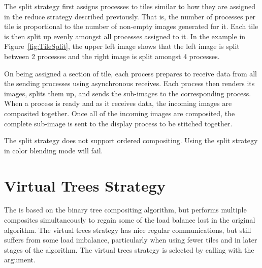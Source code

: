 The split strategy first assigns processes to tiles similar to how they are
assigned in the reduce strategy described previously.  That is, the number
of processes per tile is proportional to the number of non-empty images
generated for it.  Each tile is then split up evenly amongst all processes
assigned to it.  In the example in Figure~\ref{fig:TileSplit}, the upper
left image shows that the left image is split between 2 processes and the
right image is split amongst 4 processes.

On being assigned a section of tile, each process prepares to receive data
from all the sending processes using asynchronous receives.  Each process
then renders its images, splits them up, and sends the sub-images to the
corresponding process.  When a process is ready and as it receives data,
the incoming images are composited together.  Once all of the incoming
images are composited, the complete sub-image is sent to the display process
to be stitched together.

The split strategy does not support ordered compositing.  Using the split
strategy in color blending mode will fail.


\section{Virtual Trees Strategy}
\label{sec:Strategies:Vertial_Trees}


The  is based on the binary tree
compositing algorithm, but performs multiple composites simultaneously to
regain some of the load balance lost in the original algorithm.  The
virtual trees strategy has nice regular communications, but still suffers
from some load imbalance, particularly when using fewer tiles and in later
stages of the algorithm.  The virtual trees strategy is selected by calling
 with the  argument.

